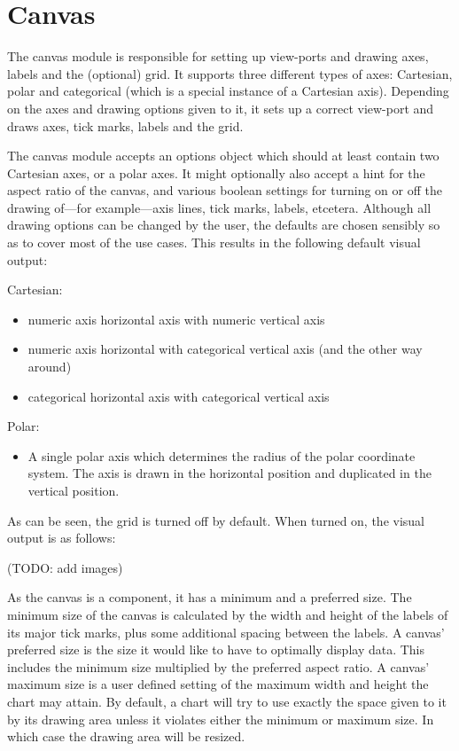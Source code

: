 \section{Canvas}
The canvas module is responsible for setting up view-ports and drawing axes, labels and the (optional) grid. It supports three different types of axes: Cartesian, polar and categorical (which is a special instance of a Cartesian axis). Depending on the axes and drawing options given to it, it sets up a correct view-port and draws axes, tick marks, labels and the grid. 

The canvas module accepts an options object which should at least contain two Cartesian axes, or a polar axes. It might optionally also accept a hint for the aspect ratio of the canvas, and various boolean settings for turning on or off the drawing of---for example---axis lines, tick marks, labels, etcetera. Although all drawing options can be changed by the user, the defaults are chosen sensibly so as to cover most of the use cases. This results in the following default visual output:

Cartesian:
\begin{itemize}
\item numeric axis horizontal axis with numeric vertical axis
\item numeric axis horizontal with categorical vertical axis (and the other way around)
\item categorical horizontal axis with categorical vertical axis
\end{itemize}

Polar:
\begin{itemize}
\item A single polar axis which determines the radius of the polar coordinate system. The axis is drawn in the horizontal position and duplicated in the vertical position.
\end{itemize}

As can be seen, the grid is turned off by default. When turned on, the visual output is as follows:

(TODO: add images)

As the canvas is a component, it has a minimum and a preferred size. The minimum size of the canvas is calculated by the width and height of the labels of its major tick marks, plus some additional spacing between the labels. A canvas' preferred size is the size it would like to have to optimally display data. This includes the minimum size multiplied by the preferred aspect ratio. A canvas' maximum size is a user defined setting of the maximum width and height the chart may attain. By default, a chart will try to use exactly the space given to it by its drawing area unless it violates either the minimum or maximum size. In which case the drawing area will be resized.

